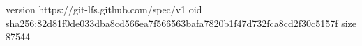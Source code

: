 version https://git-lfs.github.com/spec/v1
oid sha256:82d81f0de033dba8cd566ea7f566563bafa7820b1f47d732fca8cd2f30c5157f
size 87544
